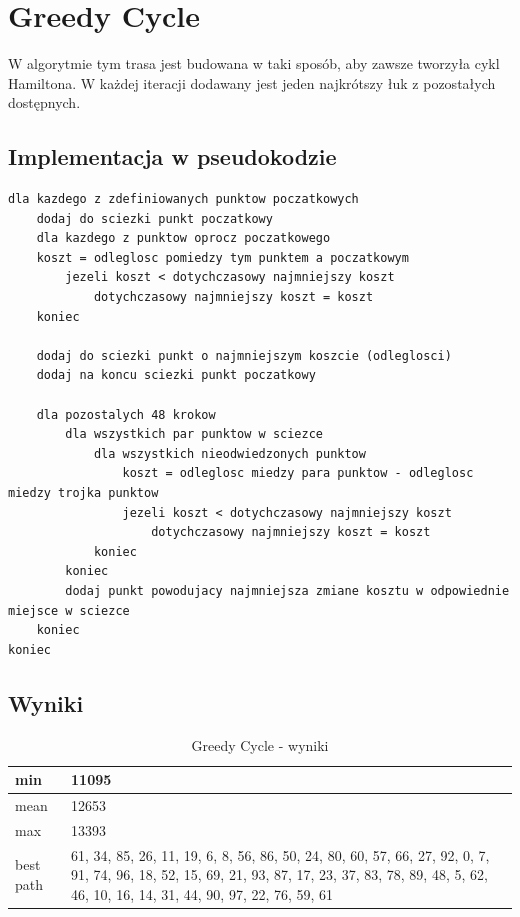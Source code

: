 \documentclass[a4paper 10pt]{article}
\begin{document}
\section{Greedy Cycle}
\label{Greedy}
W algorytmie tym trasa jest budowana w taki sposób, aby zawsze tworzyła cykl Hamiltona. W każdej iteracji dodawany jest jeden najkrótszy łuk z pozostałych dostępnych.
\subsection{Implementacja w pseudokodzie}
\begin{lstlisting}[frame=single]
dla kazdego z zdefiniowanych punktow poczatkowych
	dodaj do sciezki punkt poczatkowy
	dla kazdego z punktow oprocz poczatkowego
	koszt = odleglosc pomiedzy tym punktem a poczatkowym
		jezeli koszt < dotychczasowy najmniejszy koszt
			dotychczasowy najmniejszy koszt = koszt
	koniec
	
	dodaj do sciezki punkt o najmniejszym koszcie (odleglosci)
	dodaj na koncu sciezki punkt poczatkowy
	
	dla pozostalych 48 krokow
		dla wszystkich par punktow w sciezce
			dla wszystkich nieodwiedzonych punktow
				koszt = odleglosc miedzy para punktow - odleglosc miedzy trojka punktow
				jezeli koszt < dotychczasowy najmniejszy koszt
					dotychczasowy najmniejszy koszt = koszt
			koniec
		koniec
		dodaj punkt powodujacy najmniejsza zmiane kosztu w odpowiednie miejsce w sciezce
	koniec	
koniec

\end{lstlisting}
\subsection{Wyniki}
\begin{table}[H]
\center
\caption{Greedy Cycle - wyniki}
\label{Greedy Cycle - wyniki}
\begin{tabular}{|p{1cm}|p{14cm}|}
\hline
min       & 11095                                                                                                                                                                                                 \\ \hline
mean      & 12653                                                                                                                                                                                                 \\ \hline
max       & 13393                                                                                                                                                                                                 \\ \hline
best path & 61, 34, 85, 26, 11, 19, 6, 8, 56, 86, 50, 24, 80, 60, 57, 66, 27, 92, 0, 7, 91, 74, 96, 18, 52, 15, 69, 21, 93, 87, 17, 23, 37, 83, 78, 89, 48, 5, 62, 46, 10, 16, 14, 31, 44, 90, 97, 22, 76, 59, 61 \\ \hline
\end{tabular}
\end{table}
\end{document}
